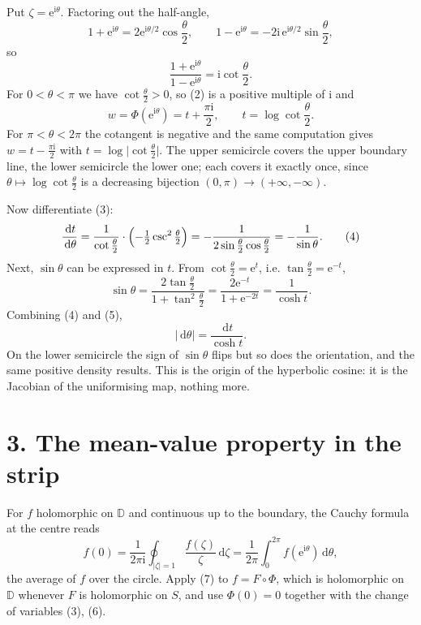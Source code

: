 \documentclass[12pt]{article}
\newcommand{\dd}{\,\mathrm{d}}
\newcommand{\ii}{\mathrm{i}}
\newcommand{\e}{\mathrm{e}}
\newcommand{\D}{\mathbb D}
\begin{document}
Put \(\zeta=\e^{\ii\theta}\). Factoring out the half-angle,
\[
1+\e^{\ii\theta}=2\e^{\ii\theta/2}\cos\frac\theta2,
\qquad
1-\e^{\ii\theta}=-2\ii\,\e^{\ii\theta/2}\sin\frac\theta2,
\]
so
\[
\frac{1+\e^{\ii\theta}}{1-\e^{\ii\theta}}
=\ii\cot\frac{\theta}{2}.
\tag{2}
\]
For \(0<\theta<\pi\) we have \(\cot\frac\theta2>0\), so (2) is a positive
multiple of \(\ii\) and
\[
w=\Phi(\e^{\ii\theta})=t+\frac{\pi\ii}{2},
\qquad
t=\log\cot\frac\theta2 .
\tag{3}
\]
For \(\pi<\theta<2\pi\) the cotangent is negative and the same
computation gives \(w=t-\frac{\pi\ii}{2}\) with
\(t=\log\bigl|\cot\frac\theta2\bigr|\). The upper semicircle covers the
upper boundary line, the lower semicircle the lower one; each covers it
exactly once, since \(\theta\mapsto\log\cot\frac\theta2\) is a decreasing
bijection \((0,\pi)\to(+\infty,-\infty)\).

Now differentiate (3):
\[
\frac{\dd t}{\dd\theta}
=\frac{1}{\cot\frac\theta2}\cdot\Bigl(-\tfrac12\csc^2\tfrac\theta2\Bigr)
=-\frac1{2\sin\frac\theta2\cos\frac\theta2}
=-\frac1{\sin\theta}.
\tag{4}
\]
Next, \(\sin\theta\) can be expressed in \(t\). From \(\cot\frac\theta2=\e^{t}\), i.e. \(\tan\frac\theta2=\e^{-t}\),
\[
\sin\theta
=\frac{2\tan\frac\theta2}{1+\tan^2\frac\theta2}
=\frac{2\e^{-t}}{1+\e^{-2t}}
=\frac{1}{\cosh t}.
\tag{5}
\]
Combining (4) and (5),
\[
\boxed{\displaystyle |\dd\theta|=\frac{\dd t}{\cosh t}.}
\tag{6}
\]
On the lower semicircle the sign of \(\sin\theta\) flips but so does the
orientation, and the same positive density results. This is the origin of
the hyperbolic cosine: it is the Jacobian of the uniformising map,
nothing more.

\section*{3. The mean-value property in the strip}

For \(f\) holomorphic on \(\D\) and continuous up to the boundary, the
Cauchy formula at the centre reads
\[
f(0)=\frac1{2\pi\ii}\oint_{|\zeta|=1}\frac{f(\zeta)}{\zeta}\dd\zeta
=\frac1{2\pi}\int_0^{2\pi}f(\e^{\ii\theta})\dd\theta,
\tag{7}
\]
the average of \(f\) over the circle. Apply (7) to \(f=F\circ\Phi\), which
is holomorphic on \(\D\) whenever \(F\) is holomorphic on \(S\), and use
\(\Phi(0)=0\) together with the change of variables (3), (6).
\end{document}
